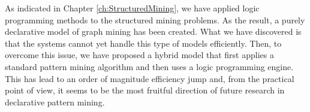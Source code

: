 As indicated in Chapter \ref{ch:StructuredMining}, we have applied 
logic programming methods to the structured mining problems. As the
result, 
a purely declarative model of graph mining has been created. What we
have discovered is that the systems cannot yet handle this type of
models efficiently. Then, to overcome this issue, we have proposed a hybrid model that
first applies a standard pattern mining algorithm and then uses a
logic programming engine. This has lead to an order of magnitude
efficiency jump and, from the practical point of view, it seems to be
the most fruitful direction of future research in declarative pattern
mining.



\cleardoublepage


